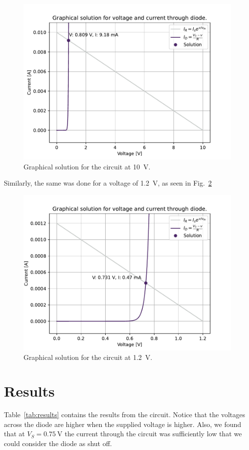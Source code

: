 \documentclass{../../ece-report}
\begin{document}
\begin{figure}[h!]
  \centering
  \includegraphics[width=0.7 \textwidth]{../plots/pdf/datasheet_diode_10V.pdf}
  \caption{Graphical solution for the circuit at 10~V.}
  \label{fig:10V}
\end{figure}

Similarly, the same was done for a voltage of 1.2~V, as seen in Fig.~\ref{fig:1.2V}

\begin{figure}[h!]
  \centering
  \includegraphics[width=0.7 \textwidth]{../plots/pdf/datasheet_diode_1.2V.pdf}
  \caption{Graphical solution for the circuit at 1.2~V.}
  \label{fig:1.2V}
\end{figure}

\section{Results}

Table~\ref{tab:results} contains the results from the
circuit. Notice that the voltages across the diode are
higher when the supplied voltage is higher. Also, we
found that at $V_S=0.75~\si{\V}$ the current through
the circuit was sufficiently low that we could consider
the diode as shut off.
\end{document}
